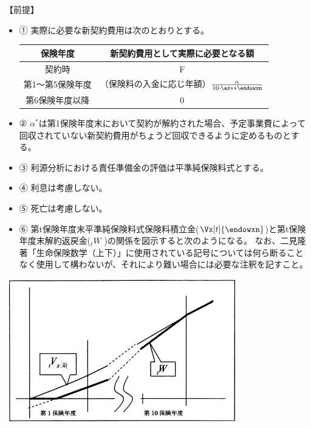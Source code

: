 \documentclass[report,gutter=10mm,fore-edge=10mm,uplatex,dvipdfmx]{jlreq}
\begin{document}
【前提】
\begin{itemize}
 \item ① 実際に必要な新契約費用は次のとおりとする。
\begin{table}[h]
  \begin{tabular}[t]{|c|c|}
 \hline
  保険年度 & 新契約費用として実際に必要となる額\\
 \hline
  契約時& F\\
  第1～第5保険年度& （保険料の入金に応じ年額）$\frac{\alpha}{10\cdot\ax**{\endowxn}}$\\
 第6保険年度以降 & 0\\
 \hline
 \end{tabular}
\end{table} 
\item ② $\alpha^{*}$は第1保険年度末において契約が解約された場合、予定事業費によって回収されていない新契約費用がちょうど回収できるように定めるものとする。
 \item ③ 利源分析における責任準備金の評価は平準純保険料式とする。
 \item ④ 利息は考慮しない。
 \item ⑤ 死亡は考慮しない。
 \item ⑥ 第t保険年度末平準純保険料式保険料積立金($\Vx[t]{\endowxn}$)と第t保険年度末解約返戻金($_tW$ )の関係を図示すると次のようになる。
なお、二見隆著「生命保険数学（上下）」に使用されている記号については何ら断ることなく使用して構わないが、それにより難い場合には必要な注釈を記すこと。
\end{itemize}

\includegraphics[scale=0.8]{images/ProbH16-1-2-3.png}

\end{document}
